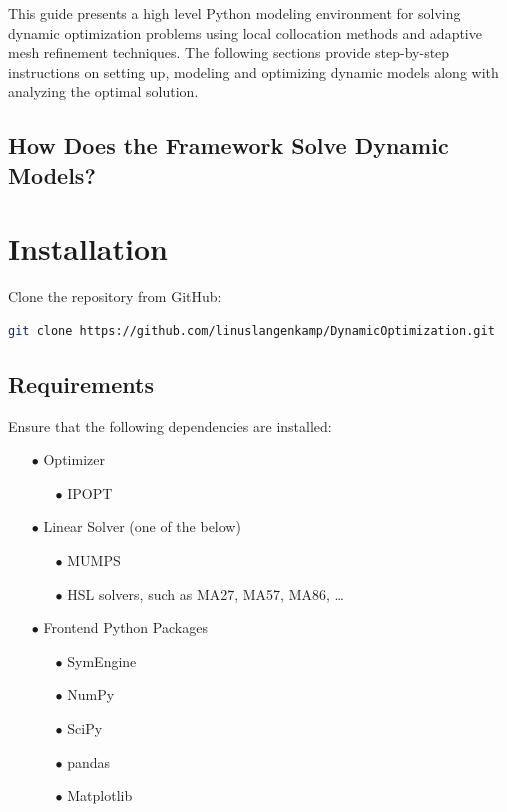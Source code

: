 \documentclass[12pt]{article}
\begin{document}
This guide presents a high level Python modeling environment for
solving dynamic optimization problems using local collocation methods and
adaptive mesh refinement techniques. The following sections provide
step-by-step instructions on setting up, modeling and optimizing dynamic models
along with analyzing the optimal solution.

\subsection{How Does the Framework Solve Dynamic Models?}
\label{c:collocation}

\section{Installation}
Clone the repository from GitHub:

\begin{lstlisting}[language=bash]
git clone https://github.com/linuslangenkamp/DynamicOptimization.git
	\end{lstlisting}

\subsection{Requirements}
Ensure that the following dependencies are installed:
\begin{itemize}

	\item[$\bullet$] Optimizer

		\begin{itemize}
			\item[$\bullet$] IPOPT
		\end{itemize}

	\item[$\bullet$] Linear Solver (one of the below)

		\begin{itemize}
			\item[$\bullet$] MUMPS
			\item[$\bullet$] HSL solvers, such as MA27, MA57, MA86,
				\ldots
		\end{itemize}

	\item[$\bullet$] Frontend Python Packages

		\begin{itemize}
			\item[$\bullet$] SymEngine
			\item[$\bullet$] NumPy
			\item[$\bullet$] SciPy
			\item[$\bullet$] pandas
			\item[$\bullet$] Matplotlib
		\end{itemize}
\end{itemize}
\end{document}
